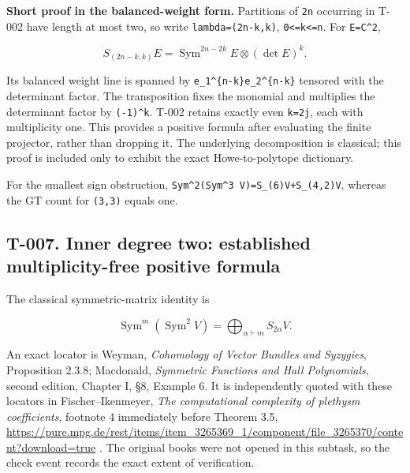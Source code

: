 \documentclass[
  10pt,
]{article}
\begin{document}
\textbf{Short proof in the balanced-weight form.} Partitions of
\texttt{\small 2n} occurring in T-002 have length at most two, so write
\texttt{\small lambda=\allowbreak{}(\allowbreak{}2n-\allowbreak{}k,\allowbreak{}k)\allowbreak{}},
\texttt{\small 0<=\allowbreak{}k<=\allowbreak{}n}. For
\texttt{\small E=\allowbreak{}C\textasciicircum{}2},

\[
S_{(2n-k,k)}E=\operatorname{Sym}^{2n-2k}E\otimes(\det E)^k.
\]

Its balanced weight line is spanned by
\texttt{\small e\_\allowbreak{}1\textasciicircum{}\{n-\allowbreak{}k\}e\_\allowbreak{}2\textasciicircum{}\{n-\allowbreak{}k\}}
tensored with the determinant factor. The transposition fixes the
monomial and multiplies the determinant factor by
\texttt{\small (\allowbreak{}-\allowbreak{}1)\allowbreak{}\textasciicircum{}k}.
T-002 retains exactly even \texttt{\small k=\allowbreak{}2j}, each with
multiplicity one. This provides a positive formula after evaluating the
finite projector, rather than dropping it. The underlying decomposition
is classical; this proof is included only to exhibit the exact
Howe-to-polytope dictionary.

For the smallest sign obstruction,
\texttt{\small Sym\textasciicircum{}2(\allowbreak{}Sym\textasciicircum{}3 V)\allowbreak{}=\allowbreak{}S\_\allowbreak{}(\allowbreak{}6)\allowbreak{}V+\allowbreak{}S\_\allowbreak{}(\allowbreak{}4,\allowbreak{}2)\allowbreak{}V},
whereas the GT count for
\texttt{\small (\allowbreak{}3,\allowbreak{}3)\allowbreak{}} equals one.

\subsection{T-007. Inner degree two: established multiplicity-free
positive
formula}\label{t-007.-inner-degree-two-established-multiplicity-free-positive-formula}

The classical symmetric-matrix identity is

\[
\operatorname{Sym}^m(\operatorname{Sym}^2 V)
=\bigoplus_{\alpha\vdash m}S_{2\alpha}V.
\tag{T7.1}
\]

An exact locator is Weyman, \emph{Cohomology of Vector Bundles and
Syzygies}, Proposition 2.3.8; Macdonald, \emph{Symmetric Functions and
Hall Polynomials}, second edition, Chapter I, §8, Example 6. It is
independently quoted with these locators in Fischer--Ikenmeyer,
\emph{The computational complexity of plethysm coefficients}, footnote 4
immediately before Theorem 3.5,
\url{https://pure.mpg.de/rest/items/item_3265369_1/component/file_3265370/content?download=true}
. The original books were not opened in this subtask, so the check event
records the exact extent of verification.
\end{document}
